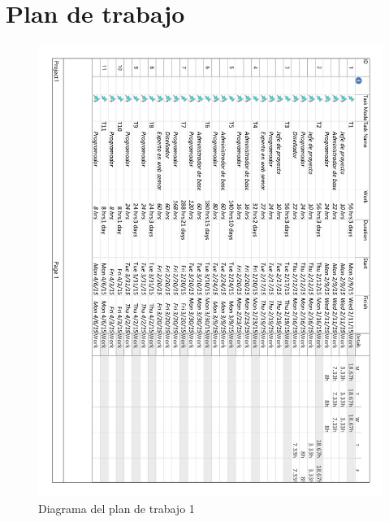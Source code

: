 \section{Plan de trabajo}

\begin{figure}[!htp]
	\centering
	\includegraphics[page=1, scale=.8]{fig/work_plan_diagram}
	\caption{Diagrama del plan de trabajo 1}
\end{figure}

